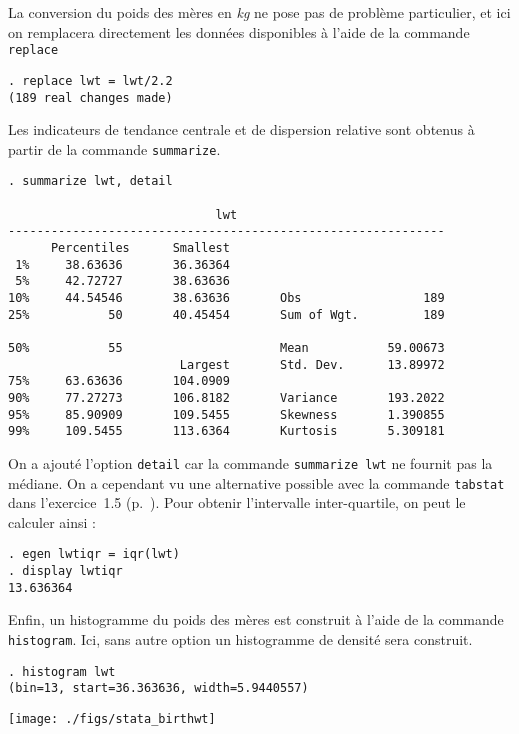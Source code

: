 La conversion du poids des mères en \emph{kg} ne pose pas de problème
particulier, et ici on remplacera directement les données disponibles à
l'aide de la commande \texttt{replace}
\begin{verbatim}
. replace lwt = lwt/2.2
(189 real changes made)
\end{verbatim}
Les indicateurs de tendance centrale et de dispersion relative sont obtenus
à partir de la commande \verb|summarize|.
\begin{verbatim}
. summarize lwt, detail

                             lwt
-------------------------------------------------------------
      Percentiles      Smallest
 1%     38.63636       36.36364
 5%     42.72727       38.63636
10%     44.54546       38.63636       Obs                 189
25%           50       40.45454       Sum of Wgt.         189

50%           55                      Mean           59.00673
                        Largest       Std. Dev.      13.89972
75%     63.63636       104.0909
90%     77.27273       106.8182       Variance       193.2022
95%     85.90909       109.5455       Skewness       1.390855
99%     109.5455       113.6364       Kurtosis       5.309181
\end{verbatim}
On a ajouté l'option \texttt{detail} car la commande \verb|summarize lwt| ne
fournit pas la médiane. On a cependant vu une alternative possible avec la
commande \texttt{tabstat} dans l'exercice~1.5
(p.~\pageref{para:tabstat}). Pour obtenir l'intervalle inter-quartile, on
peut le calculer ainsi :
\begin{verbatim}
. egen lwtiqr = iqr(lwt)
. display lwtiqr
13.636364
\end{verbatim}
Enfin, un histogramme du poids des mères est construit à l'aide de la
commande \verb|histogram|. Ici, sans autre option un histogramme de
densité sera construit.
\begin{verbatim}
. histogram lwt
(bin=13, start=36.363636, width=5.9440557)
\end{verbatim}

\texttt{[image: ./figs/stata\_birthwt]}

